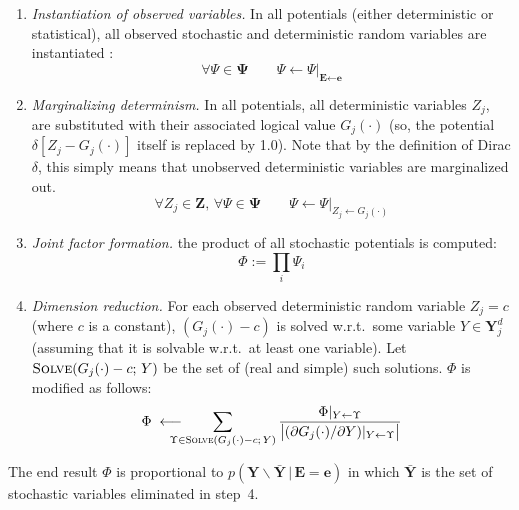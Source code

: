 \documentclass{article}
\newcommand{\bvec}[1]{\textbf{#1}}
\newcommand{\pr}{p}
\begin{document}

\begin{enumerate}
\item \emph{Instantiation of observed variables.} 
In all potentials (either deterministic or statistical), all observed stochastic and deterministic random variables are instantiated
:
\begin{equation*}
\forall \Psi \in \boldsymbol{\Psi} \qquad \Psi \leftarrow \Psi|_{\bvec{E} \leftarrow \bvec{e}}
\end{equation*} 
\item 
\emph{Marginalizing determinism.} 
In all potentials, all deterministic variables $Z_j$, are 
substituted with their associated logical value $G_j(\cdot)$ (so, the potential $\delta[Z_j - G_j(\cdot)]$ itself is replaced by 1.0). Note that by the definition of Dirac $\delta$, this simply means that  unobserved deterministic variables are marginalized out.
\begin{equation*}
\forall Z_j \in \bvec{Z},\,
\forall \Psi \in \boldsymbol{\Psi} 
\qquad
\Psi \leftarrow \Psi|_{Z_j \leftarrow G_j (\cdot)}
\end{equation*}
\item \emph{Joint factor formation.} the product of all stochastic potentials is computed: 
\begin{equation*}
\Phi := \prod_{i} \Psi_i
\end{equation*}
%
\item \emph{Dimension reduction.} %
For each observed deterministic random variable $Z_j = c$ (where $c$ is a constant),
$(G_j(\cdot) - c)$ is solved w.r.t.\ some variable 
$Y  \in \bvec{Y}_j^d$ (assuming that it is solvable %
w.r.t.\ at least one variable).
Let  
$\textsc{Solve}(G_j(\cdot) - c; \, Y)$
be the set of (real and simple) such solutions.
$\Phi$ is modified as follows:
\begin{equation}
\label{e:core}
\Phi 
\;
\longleftarrow
\!\!\!\!\!\!\!
\sum_{\Upsilon \in \textsc{Solve}(G_j(\cdot) - c;\, Y)}
\frac{\Phi|_{Y \leftarrow \Upsilon}}{
\big|(\partial G_j(\cdot) / \partial Y) |_{Y \leftarrow \Upsilon}
\big|
}
\end{equation}
\end{enumerate}
The end result $\Phi$ is proportional to 
$\pr(\bvec{Y}\backslash \bar{\bvec{Y}} \,|\, \bvec{E} = \bvec{e})$ in which 
$\bar{\bvec{Y}}$ is the set of stochastic variables eliminated in
step~4.
\end{document}
